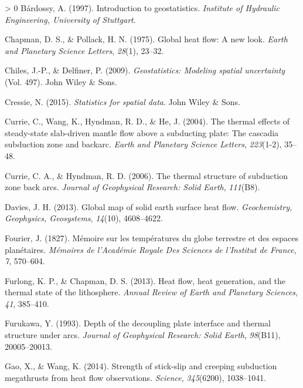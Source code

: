 \documentclass[draft,linenumbers]{agujournal2018}
\newlength{\cslhangindent}
\newenvironment{CSLReferences}[3] %
 {%
  \setlength{\parindent}{0pt}
  \ifodd #1 \everypar{\setlength{\hangindent}{\cslhangindent}}\ignorespaces\fi
  \ifnum #2 > 0
  \setlength{\parskip}{#2\baselineskip}
  \fi
 }%
 {}
\begin{document}
\hypertarget{refs}{}
\begin{CSLReferences}{1}{0}
\leavevmode\hypertarget{ref-bardossy1997}{}%
Bárdossy, A. (1997). Introduction to geostatistics. \emph{Institute of
Hydraulic Engineering, University of Stuttgart}.

\leavevmode\hypertarget{ref-chapman1975}{}%
Chapman, D. S., \& Pollack, H. N. (1975). Global heat flow: A new look.
\emph{Earth and Planetary Science Letters}, \emph{28}(1), 23--32.

\leavevmode\hypertarget{ref-chiles2009}{}%
Chiles, J.-P., \& Delfiner, P. (2009). \emph{Geostatistics: Modeling
spatial uncertainty} (Vol. 497). John Wiley \& Sons.

\leavevmode\hypertarget{ref-cressie2015}{}%
Cressie, N. (2015). \emph{Statistics for spatial data}. John Wiley \&
Sons.

\leavevmode\hypertarget{ref-currie2004}{}%
Currie, C., Wang, K., Hyndman, R. D., \& He, J. (2004). The thermal
effects of steady-state slab-driven mantle flow above a subducting
plate: The cascadia subduction zone and backarc. \emph{Earth and
Planetary Science Letters}, \emph{223}(1-2), 35--48.

\leavevmode\hypertarget{ref-currie2006}{}%
Currie, C. A., \& Hyndman, R. D. (2006). The thermal structure of
subduction zone back arcs. \emph{Journal of Geophysical Research: Solid
Earth}, \emph{111}(B8).

\leavevmode\hypertarget{ref-davies2013}{}%
Davies, J. H. (2013). Global map of solid earth surface heat flow.
\emph{Geochemistry, Geophysics, Geosystems}, \emph{14}(10), 4608--4622.

\leavevmode\hypertarget{ref-fourier1827}{}%
Fourier, J. (1827). M{é}moire sur les temp{é}ratures du globe terrestre
et des espaces plan{é}taires. \emph{M{é}moires de l'Acad{é}mie Royale
Des Sciences de l'Institut de France}, \emph{7}, 570--604.

\leavevmode\hypertarget{ref-furlong2013}{}%
Furlong, K. P., \& Chapman, D. S. (2013). Heat flow, heat generation,
and the thermal state of the lithosphere. \emph{Annual Review of Earth
and Planetary Sciences}, \emph{41}, 385--410.

\leavevmode\hypertarget{ref-furukawa1993}{}%
Furukawa, Y. (1993). Depth of the decoupling plate interface and thermal
structure under arcs. \emph{Journal of Geophysical Research: Solid
Earth}, \emph{98}(B11), 20005--20013.

\leavevmode\hypertarget{ref-gao2014}{}%
Gao, X., \& Wang, K. (2014). Strength of stick-slip and creeping
subduction megathrusts from heat flow observations. \emph{Science},
\emph{345}(6200), 1038--1041.


\end{CSLReferences}
\end{document}
